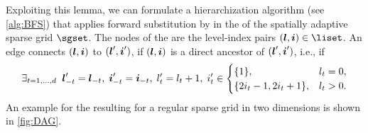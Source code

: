 Exploiting this lemma, we can formulate
a hierarchization algorithm (see \cref{alg:BFS})
that applies forward substitution by \bfs in the \dagr of
the spatially adaptive sparse grid $\sgset$.
The nodes of the \dagr are the level-index pairs $(\*l, \*i) \in \liset$.
An edge connects $({\boldsymbol{l}}, {\boldsymbol{i}})$ to $({\boldsymbol{l}}', {\boldsymbol{i}}')$,
if $({\boldsymbol{l}}, {\boldsymbol{i}})$ is a direct ancestor of $({\boldsymbol{l}}', {\boldsymbol{i}}')$, i.e., if
\begin{equation}
  \label{eq:directAncestor}
  \exlarge{t = 1, \dotsc, d}{
    \*l'_{-t} = \*l_{-t},\;
    \*i'_{-t} = \*i_{-t},\;
    l'_t = l_t + 1,\;
    i'_t \in
    \begin{cases}
      \{1\},&l_t = 0,\\
      \{2i_t - 1, 2i_t + 1\},&l_t > 0.
    \end{cases}
  }
\end{equation}
An example for the resulting \dagr for a regular sparse grid
in two dimensions is shown in \cref{fig:DAG}.

